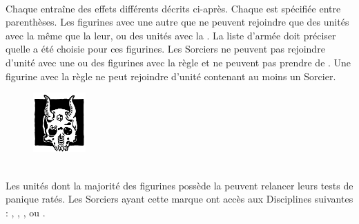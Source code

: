 \newcommand{\specialshootingweapon}{%
\vspace*{0.1cm}
\renewcommand{\arraystretch}{1.5}
\rowcolors{1}{}{lightgray}
\begin{center}\begin{tabular}{M{3cm}m{5cm}M{1cm}M{0.5cm}M{2cm}M{2cm}M{2cm}}
\hline
		& \centering\textbf{\underline{SPECIAL SHOOTING WEAPON}} & \centering\textbf{Portée} & \centering\textbf{S} & Tir Multiple & Blessure Multiple & \centering\textbf{\armourpiercing{}}\tabularnewline

Hellscream Cannon & Hellscream Cannon (1) Catapult (\distance{3}) & 12-60 & 4[9] & - & [Ordnance] & 1\tabularnewline

& Hellscream Cannon (2) Catapult (\distance{3}) & 12-24 & 3 & - & - & 1\tabularnewline

\hline
\end{tabular}\end{center}
}






\startarmyspecialrules

\armyspecialruleentry{\markofthedarkgods{}}\\
Chaque \markofthedarkgods{} entraîne des effets différents décrits ci-après. Chaque \markofthedarkgods{} est spécifiée entre parenthèses. Les figurines avec une \markofthedarkgods{} autre que \TrueChaos{} ne peuvent rejoindre que des unités avec la même \markofthedarkgods{} que la leur, ou des unités avec la . La liste d'armée doit préciser quelle \markofthedarkgods{} a été choisie pour ces figurines. Les Sorciers ne peuvent pas rejoindre d'unité avec une  ou des figurines avec la règle  et ne peuvent pas prendre de . Une figurine avec la règle  ne peut rejoindre d'unité contenant au moins un Sorcier.\\

\begin{figure}
\centering
\includegraphics[width=2cm]{pics/WDG1.png}
\end{figure}
\textbf{\MarkofTrueChaos{}}\\
Les unités dont la majorité des figurines possède la  peuvent relancer leurs tests de panique ratés. Les Sorciers ayant cette marque ont accès aux Disciplines suivantes : \alchemy, \heavens {}, \fire, \death{} ou \shadows.\\

